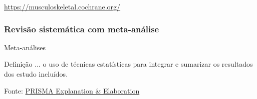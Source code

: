 \documentclass{beamer}
\begin{document}
\begin{frame}
  \url{https://musculoskeletal.cochrane.org/}
\end{frame}

\subsubsection[Meta-análise]{Revisão sistemática com meta-análise}

\begin{frame}{Meta-análises}
  \begin{block}{Definição}
    \footnotesize
    ... o uso de técnicas estatísticas para integrar e sumarizar os resultados dos estudo incluídos.
  \end{block}

  \vfill
  \scriptsize
  \hfill Fonte: \href{https://doi.org/10.1371/journal.pmed.1000100}
  {\tiny PRISMA Explanation \& Elaboration}
\end{frame}
\end{document}
